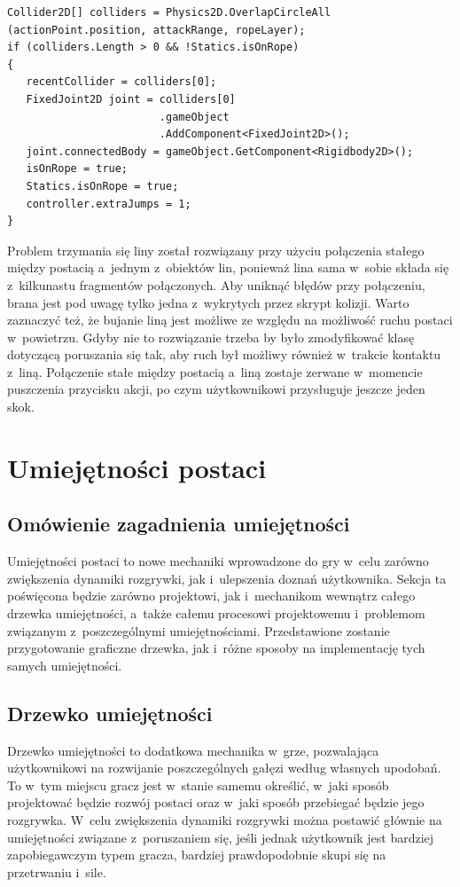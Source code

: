 \documentclass[oneside,polski,logo]{amuthesis}
\begin{document}
\newpage
\begin{lstlisting}[breaklines=true,
language={[Sharp]C},
rulecolor=\color{blue!80!black},
caption={Fragment klasy \texttt{PlayerMovement.cs}}
]    
Collider2D[] colliders = Physics2D.OverlapCircleAll
(actionPoint.position, attackRange, ropeLayer);
if (colliders.Length > 0 && !Statics.isOnRope)
{
   recentCollider = colliders[0];
   FixedJoint2D joint = colliders[0]
                        .gameObject
                        .AddComponent<FixedJoint2D>();
   joint.connectedBody = gameObject.GetComponent<Rigidbody2D>();
   isOnRope = true;
   Statics.isOnRope = true;
   controller.extraJumps = 1;
}

\end{lstlisting}

Problem trzymania się liny został rozwiązany przy użyciu połączenia stałego między postacią a~jednym z~obiektów lin, ponieważ lina sama w~sobie składa się z~kilkunastu fragmentów połączonych. Aby uniknąć błędów przy połączeniu, brana jest pod uwagę tylko jedna z~wykrytych przez skrypt kolizji. Warto zaznaczyć też, że bujanie liną jest możliwe ze względu na możliwość ruchu postaci w~powietrzu. Gdyby nie to rozwiązanie trzeba by było zmodyfikować klasę dotyczącą poruszania się tak, aby ruch był możliwy również w~trakcie kontaktu z~liną. Połączenie stałe między postacią a~liną zostaje zerwane w~momencie puszczenia przycisku akcji, po czym użytkownikowi przysługuje jeszcze jeden skok.

\section{Umiejętności postaci}
\subsection{Omówienie zagadnienia umiejętności}
Umiejętności postaci to nowe mechaniki wprowadzone do gry w~celu zarówno zwiększenia dynamiki rozgrywki, jak i~ulepszenia doznań użytkownika. Sekcja ta poświęcona będzie zarówno projektowi, jak i~mechanikom wewnątrz całego drzewka umiejętności, a~także całemu procesowi projektowemu i~problemom związanym z~poszczególnymi umiejętnościami. Przedstawione zostanie przygotowanie graficzne drzewka, jak i~różne sposoby na implementację tych samych umiejętności.

\subsection{Drzewko umiejętności}
Drzewko umiejętności to dodatkowa mechanika w~grze, pozwalająca użytkownikowi na rozwijanie poszczególnych gałęzi według własnych upodobań. To w~tym miejscu gracz jest w~stanie samemu określić, w~jaki sposób projektować będzie rozwój postaci oraz w~jaki sposób przebiegać będzie jego rozgrywka. W~celu zwiększenia dynamiki rozgrywki można postawić głównie na umiejętności związane z~poruszaniem się, jeśli jednak użytkownik jest bardziej zapobiegawczym typem gracza, bardziej prawdopodobnie skupi się na przetrwaniu i~sile.
\end{document}

